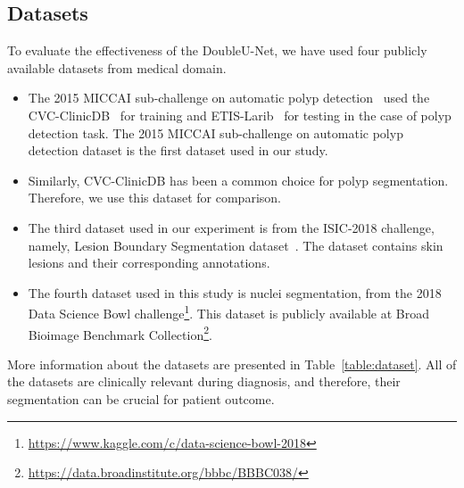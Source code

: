 \documentclass[conference]{IEEEtran}
\begin{document}
\subsection{Datasets}
To evaluate the effectiveness of the DoubleU-Net, we have used four publicly available datasets from medical domain.
\begin{itemize}

\item The 2015 MICCAI sub-challenge on automatic polyp detection~\cite{bernal2017comparative} used the CVC-ClinicDB~\cite{bernal2015wm} for training and ETIS-Larib~\cite{silva2014toward} for testing in the case of polyp detection task. The 2015 MICCAI sub-challenge on automatic polyp detection dataset is the first dataset used in our study. 

\item Similarly, CVC-ClinicDB has been a common choice for polyp segmentation.  Therefore, we use this dataset for comparison. 

\item The third dataset used in our experiment is from the ISIC-2018 challenge, namely, Lesion Boundary Segmentation dataset~\cite{codella2018skin,tschandl2018ham10000}. The dataset contains skin lesions and their corresponding annotations. 

\item The fourth dataset used in this study is nuclei segmentation, from the 2018 Data Science Bowl challenge\footnote{\url{https://www.kaggle.com/c/data-science-bowl-2018}}. This dataset is publicly available at Broad Bioimage Benchmark Collection\footnote{\url{https://data.broadinstitute.org/bbbc/BBBC038/}}.

\end{itemize}
More information about the datasets are presented in Table~\ref{table:dataset}. All of the datasets are clinically relevant during diagnosis, and therefore, their segmentation can be crucial for patient outcome.


\begin{table} [!t]
 \caption{Summary of biomedical segmentation dataset used in our experiments}
    \label{table:dataset}
  \def\arraystretch{1.1}
    \setlength\tabcolsep{5pt}
    \par\bigskip
    \centering
\end{table}	
\end{document}
